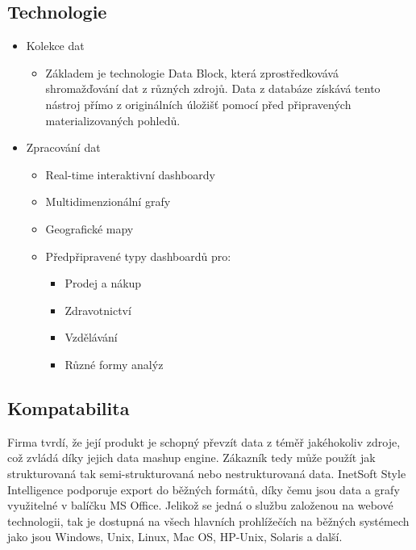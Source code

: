 \documentclass[czech,BP]{thesiskiv2}
\begin{document}
\subsection{Technologie}
\begin{itemize}
	\item Kolekce dat
	\begin{itemize}
		\item Základem je technologie Data Block\texttrademark, která zprostředkovává shromažďování dat z různých zdrojů. Data z databáze získává tento nástroj přímo z originálních úložišť pomocí před připravených materializovaných pohledů.
	\end{itemize}
	\item Zpracování dat
	\begin{itemize}
		\item Real-time interaktivní dashboardy
		\item Multidimenzionální grafy
		\item Geografické mapy
		\item Předpřipravené typy dashboardů pro:
		\begin{itemize}
			\item Prodej a nákup
			\item Zdravotnictví
			\item Vzdělávání
			\item Různé formy analýz
		\end{itemize}
	\end{itemize}
\end{itemize}

\subsection{Kompatabilita}
Firma tvrdí, že její produkt je schopný převzít data z téměř jakéhokoliv zdroje, což zvládá díky jejich data mashup engine. Zákazník tedy může použít jak strukturovaná tak semi-strukturovaná nebo nestrukturovaná data. InetSoft Style Intelligence podporuje export do běžných formátů, díky čemu jsou data a grafy využitelné v balíčku MS Office. Jelikož se jedná o službu založenou na webové technologii, tak je dostupná na všech hlavních prohlížečích na běžných systémech jako jsou Windows, Unix, Linux, Mac OS, HP-Unix, Solaris a další.\cite{InetKompatilbilita}
\end{document}
